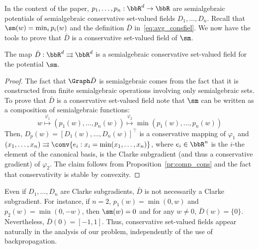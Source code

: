 \begin{comment}
\begin{lemma}
    Let $\cL_1, \ldots, \cL_n : \bbR^d \rightarrow \bbR$ be locally Lipschitz continuous potentials with conservative gradients $D_1, \ldots, D_n: \bbR^d \rightrightarrows \bbR^d$. Then $\sum_{i=1}^nD_i$ is a conservative gradient of $\sum_{i=1}^n\cL_i$
\end{lemma}
\begin{proof}
  Immediate from Definition~\ref{def:cons_f}.
\end{proof}
\end{comment}

 In the context of the paper, $p_1, \ldots, p_n : \bbR^d \rightarrow \bbR$ are semialgebraic potentials of semialgebraic conservative set-valued fields $D_1, \ldots, D_n$. Recall that $\sm(w) = \min_{i} p_i(w)$ and the definition $\bar{D}$ in~\eqref{eq:avg_consfiel}. We now have the tools to prove that $\bar{D}$ is a conservative set-valued field of $\sm$.

\begin{lemma}\label{lm:max_consgrad}
  The map $\bar{D}: \bbR^d \rightrightarrows \bbR^d$ is a semialgebraic conservative set-valued field for the potential $\sm$.
\end{lemma}
\begin{proof}
  The fact that $\Graph\bar{D}$ is semialgebraic comes from the fact that it is constructed from finite semialgebraic operations involving only semialgebraic sets. To prove that $\bar{D}$ is a conservative set-valued field note that $\sm$ can be written as a composition of semialgebraic functions:
  \begin{equation*}
    w \overset{\varphi_1}{\mapsto} (p_1(w), \ldots, p_n(w)) \overset{\varphi_2}{\mapsto} \min(p_1(w), \ldots, p_n(w))
  \end{equation*}
   Then, $D_p(w) = [D_1(w), \ldots, D_n(w)]^{\top}$ is a conservative mapping of $\varphi_1$ and $(x_1, \ldots, x_n) \rightrightarrows \conv\{ e_i : x_i = \min(x_1, \ldots, x_n) \}$, where $e_i \in \bbR^n$ is the $i$-the element of the canonical basis, is the Clarke subgradient (and thus a conservative gradient) of $\varphi_2$. The claim follows from Proposition~\ref{pr:comp_cons} and the fact that conservativity is stable by convexity.
\end{proof}

\begin{remark}\label{rmk:max_subg}
  Even if $D_1, \ldots, D_n$ are Clarke subgradients, $\bar{D}$ is not necessarily a Clarke subgradient. For instance, if $n=2$, $p_1(w) = \min(0,w)$ and $p_2(w) = \min(0, -w)$, then $\sm(w) = 0$ and for any $w \neq 0$, $\bar{D}(w) = \{0\}$. Nevertheless, $\bar{D}(0) = [-1,1]$. Thus, conservative set-valued fields appear naturally in the analysis of our problem, independently of the use of backpropagation.
\end{remark}

